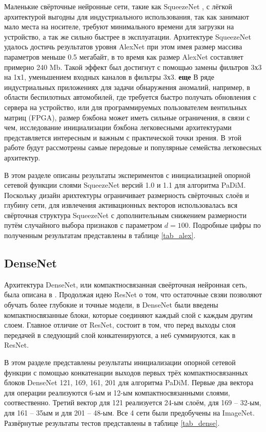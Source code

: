 \documentclass{article}
\begin{document}
\begin{large}
Маленькие свёрточные нейронные сети, такие как SqueezeNet \cite{squeeze}, с лёгкой архитектурой выгодны для индустриального использования, так как занимают мало места на носителе, требуют минимального времени для загрузки на устройство, а так же сильно быстрее в эксплуатации. Архитектуре SqueezeNet удалось достичь результатов уровня AlexNet при этом имея размер массива параметров меньше 0.5 мегабайт, в то время как размер AlexNet составляет примерно 240 Mb. Такой эффект был достигнут с помощью замены фильтров 3х3 на 1х1, уменьшением входных каналов в фильтры 3х3. \textbf{еще} В ряде индустриальных приложениях для задачи обнаружения аномалий, например, в области беспилотных автомобилей, где требуется быстро получать обновления с сервера на устройство, или для программируемых пользователем вентильных матриц (FPGA), размер бэкбона может иметь сильные ограничения, в связи с чем, исследование инициализации бэкбона легковесными архитектурами представляется интересным и важным с практической точки зрения. В этой работе будут рассмотрены самые передовые и популярные семейства легковесных архитектур.

В этом разделе описаны результаты экспериментов с инициализацией опорной сетевой функции слоями SqueezeNet версий 1.0 и 1.1 для алгоритма PaDiM. Поскольку дизайн арихтектуры ограничивает размерность свёрточных слоёв и глубину сети, для извлечения активационных векторов использовалась вся свёрточная структура SqueezeNet с дополнительным снижением размерности путём случайного выбора признаков с параметром $d = 100$. Подробные цифры по полученным результатам представлены в таблице \ref{tab_alex}.

\subsection{DenseNet}

Архитектура DenseNet, или компактносвязанная свеёрточная нейронная сеть, была описана в \cite{dense}. Продолжая идею ResNet о том, что остаточные свзяи позволяют обучать более глубокие и точные модели, в DenseNet были введены компактносвязанные блоки, которые соединяют каждый слой с каждым другим слоем. Главное отличие от ResNet, состоит в том, что перед выходы слоя передачей в следующий слой конкатенируются, а не6 суммируются, как в ResNet.

В этом разделе представлены результаты инициализации опорной сетевой функции с помощью конкатенации выходов первых трёх компактносвязанных блоков DenseNet 121, 169, 161, 201 для алгоритма PaDiM. Первые два вектора для операции реализуются 6-ым и 12-ым компактносвязанными слоями, соотвественно. Третий вектор для 121 реализуется 24-ым слоём, для 169 -- 32-ым, для 161 -- 35ым и для 201 -- 48-ым. Все 4 сети были предобучены на ImageNet. Развёрнутые результаты тестов представлены в таблице \ref{tab_dense}.


\end{large}
\end{document}
